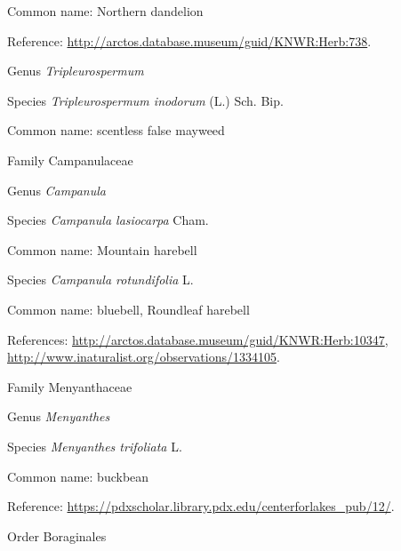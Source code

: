 \documentclass[9pt, article]{memoir}
\begin{document}
\begin{multicols}{2}
Common name: Northern dandelion

Reference: 
\url{http://arctos.database.museum/guid/KNWR:Herb:738}.

\vspace{6pt}\noindent\hspace{30pt}Genus \textit{Tripleurospermum}


\vspace{6pt}\noindent\hspace{36pt}Species \textit{Tripleurospermum inodorum} (L.) Sch. Bip.


Common name: scentless false mayweed

\vspace{6pt}\noindent\hspace{24pt}Family Campanulaceae


\vspace{6pt}\noindent\hspace{30pt}Genus \textit{Campanula}


\vspace{6pt}\noindent\hspace{36pt}Species \textit{Campanula lasiocarpa} Cham.


Common name: Mountain harebell

\vspace{6pt}\noindent\hspace{36pt}Species \textit{Campanula rotundifolia} L.


Common name: bluebell, Roundleaf harebell

References: 
\url{http://arctos.database.museum/guid/KNWR:Herb:10347}, 
\url{http://www.inaturalist.org/observations/1334105}.

\vspace{6pt}\noindent\hspace{24pt}Family Menyanthaceae


\vspace{6pt}\noindent\hspace{30pt}Genus \textit{Menyanthes}


\vspace{6pt}\noindent\hspace{36pt}Species \textit{Menyanthes trifoliata} L.


Common name: buckbean

Reference: 
\url{https://pdxscholar.library.pdx.edu/centerforlakes_pub/12/}.

\vspace{6pt}\noindent\hspace{18pt}Order Boraginales



\end{multicols}
\end{document}
